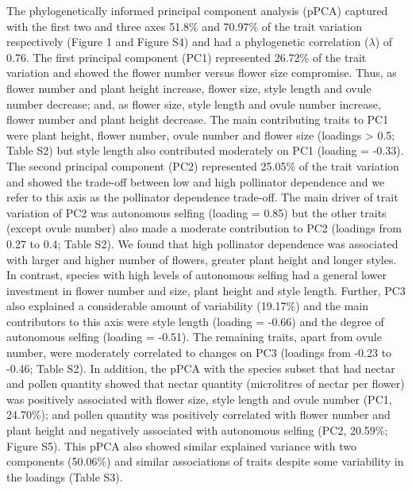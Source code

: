 \documentclass[11pt,a4paper,]{article}
\begin{document}
The phylogenetically informed principal component analysis (pPCA)
captured with the first two and three axes 51.8\% and 70.97\% of the
trait variation respectively (Figure 1 and Figure S4) and had a
phylogenetic correlation (\(\lambda\)) of 0.76. The first principal
component (PC1) represented 26.72\% of the trait variation and showed
the flower number versus flower size compromise. Thus, as flower number
and plant height increase, flower size, style length and ovule number
decrease; and, as flower size, style length and ovule number increase,
flower number and plant height decrease. The main contributing traits to
PC1 were plant height, flower number, ovule number and flower size
(loadings \textgreater{} \textbar{}0.5\textbar{}; Table S2) but style
length also contributed moderately on PC1 (loading = -0.33). The second
principal component (PC2) represented 25.05\% of the trait variation and
showed the trade-off between low and high pollinator dependence and we
refer to this axis as the pollinator dependence trade-off. The main
driver of trait variation of PC2 was autonomous selfing (loading = 0.85)
but the other traits (except ovule number) also made a moderate
contribution to PC2 (loadings from 0.27 to 0.4; Table S2). We found that
high pollinator dependence was associated with larger and higher number
of flowers, greater plant height and longer styles. In contrast, species
with high levels of autonomous selfing had a general lower investment in
flower number and size, plant height and style length. Further, PC3 also
explained a considerable amount of variability (19.17\%) and the main
contributors to this axis were style length (loading = -0.66) and the
degree of autonomous selfing (loading = -0.51). The remaining traits,
apart from ovule number, were moderately correlated to changes on PC3
(loadings from -0.23 to -0.46; Table S2). In addition, the pPCA with the
species subset that had nectar and pollen quantity showed that nectar
quantity (microlitres of nectar per flower) was positively associated
with flower size, style length and ovule number (PC1, 24.70\%); and
pollen quantity was positively correlated with flower number and plant
height and negatively associated with autonomous selfing (PC2, 20.59\%;
Figure S5). This pPCA also showed similar explained variance with two
components (50.06\%) and similar associations of traits despite some
variability in the loadings (Table S3).
\end{document}
